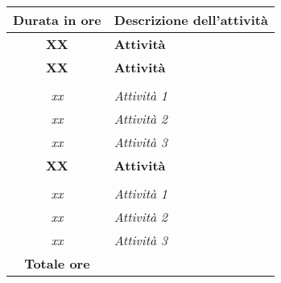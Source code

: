 

\begin{tabularx}{\textwidth}{|c|X|}
	\hline
	\textbf{Durata in ore} & \textbf{Descrizione dell'attività} \\\hline
	
	\textbf{XX} & \textbf{Attività} \\	 
    \hline
    
    \textbf{XX} & \textbf{Attività} \\	\hdashline 
    \multirow{3}{0cm}\\ 
    \textit{xx} & 
    \textit{Attività 1} \\
    \textit{xx} & 
    \textit{Attività 2} \\
    \textit{xx} & 
    \textit{Attività 3} \\
    \hline
    
    \textbf{XX} & \textbf{Attività} \\	\hdashline 
    \multirow{3}{0cm}\\ 
    \textit{xx} & 
    \textit{Attività 1} \\
    \textit{xx} & 
    \textit{Attività 2} \\
    \textit{xx} & 
    \textit{Attività 3} \\
    \hline
	
	\textbf{Totale ore} & \multicolumn{1}{|c|}{\textbf{\totaleOre}} \\\hline
	
	
\end{tabularx}